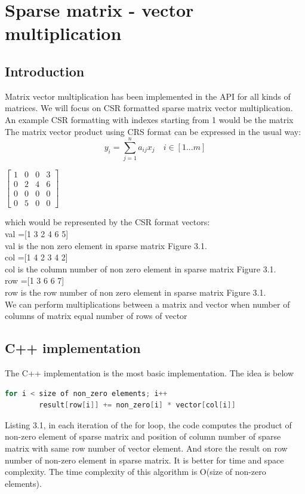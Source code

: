 \section{Sparse matrix - vector multiplication}
\subsection{Introduction}
Matrix vector multiplication has been implemented in the API for all kinds of matrices. We will focus on CSR formatted sparse matrix vector multiplication. An example CSR formatting with indexes starting from 1 would be the matrix\\

The matrix vector product  using CRS format can be expressed in the usual way:
\begin{equation}
	y_i = \sum _{j=1}^{n} a_{ij}x_j \quad    i \in [1...m]
\end{equation}

\begin{center}
	$\begin{bmatrix}
	1&0&0&3\\
	0&2&4&6\\
	0&0&0&0\\
	0&5&0&0
\end{bmatrix}$
\end{center}

which would be represented by the CSR format vectors:\\
val =[1 3 2 4 6 5]\\
val is the non zero element in sparse matrix Figure 3.1.\\
col =[1 4 2 3 4 2]\\
col is the column number of non zero element in sparse matrix Figure 3.1.\\
row =[1 3 6 6 7]\\
row is the row number of non zero element in sparse matrix Figure 3.1.\\


We can perform multiplications between a matrix and vector when number of columns of matrix equal number of rows of vector
\subsection{C++ implementation}
The C++ implementation is the most basic implementation. The idea is below\\
\begin{lstlisting}[language=C, caption=matrix vector multiplication in C++]
	for i < size of non_zero elements; i++
		result[row[i]] += non_zero[i] * vector[col[i]]
\end{lstlisting}
Listing 3.1, in each iteration of the for loop, the code computes the product of non-zero element of sparse matrix and position of column number of sparse matrix with same row number of vector element. And store the result on row number of non-zero element in sparse matrix.
It is better for time and space complexity. The time complexity of this algorithm is O(size of non-zero elements).
